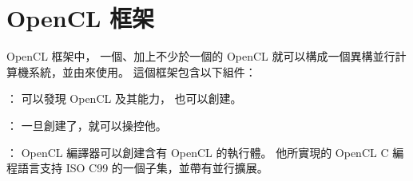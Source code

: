 \section{OpenCL 框架}
OpenCL 框架中，
一個、加上不少於一個的 OpenCL 
就可以構成一個異構並行計算機系統，並由來使用。
這個框架包含以下組件：
\startigBase
\item {}：
可以發現 OpenCL 及其能力，
也可以創建。

\item {}：
一旦創建了，就可以操控他。

\item {}：
OpenCL 編譯器可以創建含有 OpenCL 的執行體。
他所實現的 OpenCL C 編程語言支持 ISO C99 的一個子集，並帶有並行擴展。
\stopigBase

